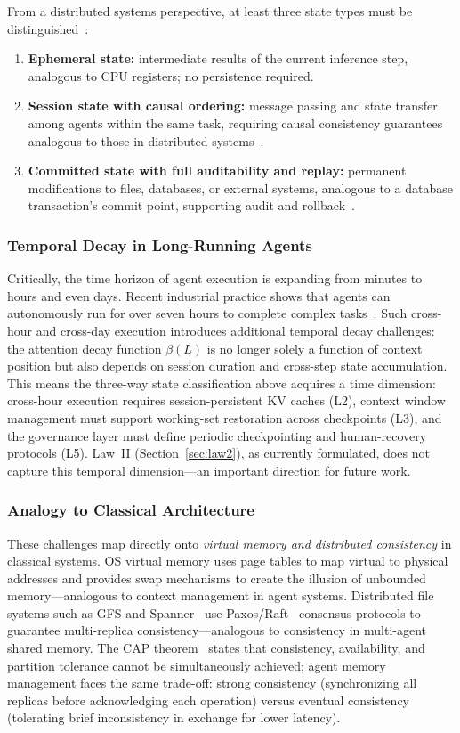 \documentclass[11pt,a4paper]{article}
\begin{document}
From a distributed systems perspective, at least three state types must be distinguished~\cite{raft2014,spanner2012,cap2002}:
\begin{enumerate}[nosep]
\item \textbf{Ephemeral state:} intermediate results of the current inference step, analogous to CPU registers; no persistence required.
\item \textbf{Session state with causal ordering:} message passing and state transfer among agents within the same task, requiring causal consistency guarantees analogous to those in distributed systems~\cite{raft2014}.
\item \textbf{Committed state with full auditability and replay:} permanent modifications to files, databases, or external systems, analogous to a database transaction's commit point, supporting audit and rollback~\cite{spanner2012}.
\end{enumerate}

\subsubsection{Temporal Decay in Long-Running Agents}
Critically, the time horizon of agent execution is expanding from minutes to hours and even days.
Recent industrial practice shows that agents can autonomously run for over seven hours to complete complex tasks~\cite{anthropic2026agenticreport}.
Such cross-hour and cross-day execution introduces additional temporal decay challenges: the attention decay function $\beta(L)$ is no longer solely a function of context position but also depends on session duration and cross-step state accumulation.
This means the three-way state classification above acquires a time dimension: cross-hour execution requires session-persistent KV caches (L2), context window management must support working-set restoration across checkpoints (L3), and the governance layer must define periodic checkpointing and human-recovery protocols (L5).
Law~II (Section~\ref{sec:law2}), as currently formulated, does not capture this temporal dimension---an important direction for future work.

\subsubsection{Analogy to Classical Architecture}
These challenges map directly onto \emph{virtual memory and distributed consistency} in classical systems.
OS virtual memory uses page tables to map virtual to physical addresses and provides swap mechanisms to create the illusion of unbounded memory---analogous to context management in agent systems.
Distributed file systems such as GFS and Spanner~\cite{spanner2012} use Paxos/Raft~\cite{raft2014} consensus protocols to guarantee multi-replica consistency---analogous to consistency in multi-agent shared memory.
The CAP theorem~\cite{cap2002} states that consistency, availability, and partition tolerance cannot be simultaneously achieved; agent memory management faces the same trade-off: strong consistency (synchronizing all replicas before acknowledging each operation) versus eventual consistency (tolerating brief inconsistency in exchange for lower latency).
\end{document}

